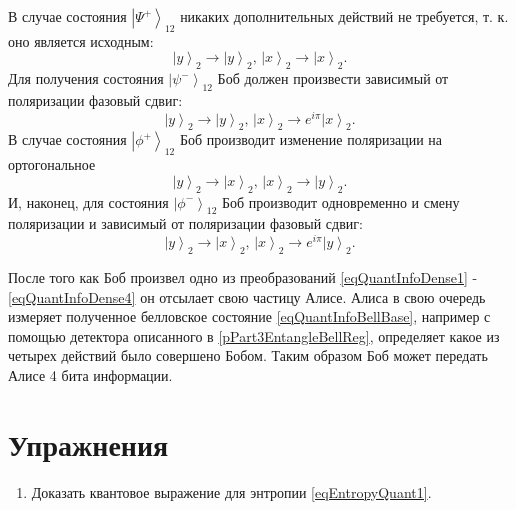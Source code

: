 В случае состояния $\left|\Psi^{+}\right>_{12}$ никаких
дополнительных действий не требуется, т. к. оно является исходным: 
\begin{equation}
\left|y\right>_2 \rightarrow \left|y\right>_2, \, 
\left|x\right>_2 \rightarrow \left|x\right>_2.
\label{eqQuantInfoDense1}
\end{equation}
Для получения состояния $\left|\psi^{-}\right>_{12}$ Боб должен
произвести зависимый от поляризации фазовый сдвиг:
\begin{equation}
\left|y\right>_2 \rightarrow \left|y\right>_2, \, 
\left|x\right>_2 \rightarrow e^{i \pi}\left|x\right>_2.
\label{eqQuantInfoDense2}
\end{equation}
В случае состояния $\left|\phi^{+}\right>_{12}$ Боб производит
изменение поляризации на ортогональное
\begin{equation}
\left|y\right>_2 \rightarrow \left|x\right>_2, \, 
\left|x\right>_2 \rightarrow \left|y\right>_2.
\label{eqQuantInfoDense3}
\end{equation}
И, наконец, для состояния $\left|\phi^{-}\right>_{12}$ Боб производит
одновременно и смену поляризации и зависимый от поляризации фазовый
сдвиг:
\begin{equation}
\left|y\right>_2 \rightarrow \left|x\right>_2, \, 
\left|x\right>_2 \rightarrow e^{i \pi}\left|y\right>_2.
\label{eqQuantInfoDense4}
\end{equation}

После того как Боб произвел одно из преобразований
\eqref{eqQuantInfoDense1} - \ref{eqQuantInfoDense4} он отсылает свою
частицу Алисе. Алиса в свою очередь измеряет полученное белловское
состояние \eqref{eqQuantInfoBellBase}, например с помощью детектора
описанного в \ref{pPart3EntangleBellReg}, определяет какое из четырех
действий было совершено Бобом. Таким образом Боб может передать Алисе
4 бита информации.




\section{Упражнения}
\begin{enumerate}
\item Доказать квантовое выражение для энтропии  \eqref{eqEntropyQuant1}.  
\end{enumerate}


